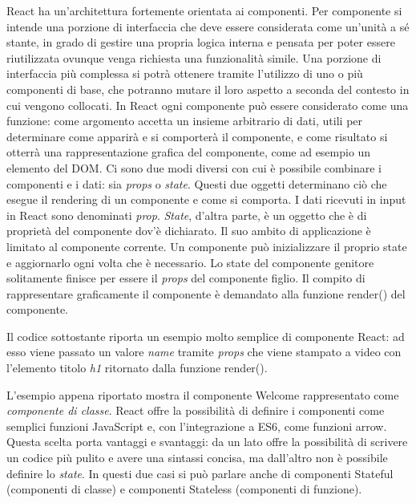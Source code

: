 React ha un'architettura fortemente orientata ai componenti. Per componente si intende una porzione di interfaccia che deve essere considerata come un'unità a sé stante, in grado di gestire una propria logica interna e pensata per poter essere riutilizzata ovunque venga richiesta una funzionalità simile. Una porzione di interfaccia più complessa si potrà ottenere tramite l’utilizzo di uno o più componenti di base, che potranno mutare il loro aspetto
a seconda del contesto in cui vengono collocati.
In React ogni componente può essere considerato come una funzione: come argomento accetta un insieme arbitrario di dati, utili per determinare come apparirà e si comporterà il componente, e come risultato si otterrà una rappresentazione grafica del componente, come ad esempio un elemento del DOM.
Ci sono due modi diversi con cui è possibile combinare i componenti e i dati: sia \textit{props} o \textit{state}. Questi due oggetti determinano ciò che esegue il rendering di un componente e come si comporta.
I dati ricevuti in input in React sono denominati \textit{prop}. \textit{State}, d'altra parte, è un oggetto che è di proprietà del componente dov'è dichiarato. Il suo ambito di applicazione è limitato al componente corrente. Un componente può inizializzare il proprio state e aggiornarlo ogni volta che è necessario. Lo state del componente genitore solitamente finisce per essere il \textit{props} del componente figlio. Il compito di rappresentare graficamente il componente è demandato alla funzione render() del componente.

Il codice sottostante riporta un esempio molto semplice di componente React: ad esso viene passato un valore \textit{name} tramite \textit{props} che viene stampato a video con l'elemento titolo \textit{h1} ritornato dalla funzione render().



L'esempio appena riportato mostra il componente Welcome rappresentato come \textit{componente di classe}. React offre la possibilità di definire i componenti come semplici funzioni JavaScript e, con l'integrazione a ES6, come funzioni arrow. Questa scelta porta vantaggi e svantaggi: da un lato offre la possibilità di scrivere un codice più pulito e avere una sintassi concisa, ma dall'altro non è possibile definire lo \textit{state}. In questi due casi si può parlare anche di componenti Stateful (componenti di classe) e componenti Stateless (componenti di funzione). 



